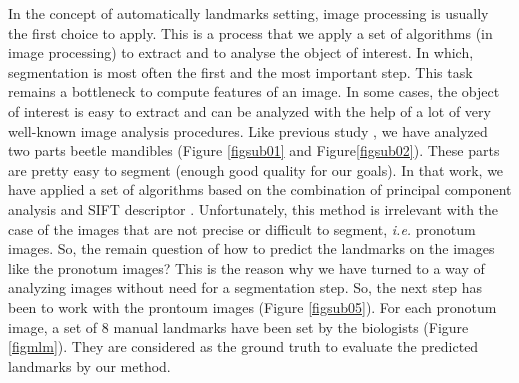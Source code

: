 \documentclass{article} %
\begin{document}
\begin{multicols}{2}
In the concept of automatically landmarks setting, image processing is usually the first choice to apply. This is a process that we apply a set of algorithms (in image processing) to extract and to analyse the object of interest. In which, segmentation is most often the first and the most important step. This task remains a bottleneck to compute features of an image. In some cases, the object of interest is easy to extract and can be analyzed with the help of a lot of very well-known image analysis procedures. Like previous study \cite{le2017maelab}, we have analyzed two parts beetle mandibles (Figure \ref{figsub01} and Figure\ref{figsub02}). These parts are pretty easy to segment (enough good quality for our goals). In that work, we have applied a set of algorithms based on the combination of principal component analysis \cite{shlens2014tutorial} and SIFT descriptor \cite{lowe2004distinctive}. 
Unfortunately, this method is irrelevant with the case of the images that are not precise or difficult to segment, \textit{i.e.} pronotum images. So, the remain question of how to predict the landmarks on the images like the pronotum images? This is the reason why we have turned to a way of analyzing images without need for a segmentation step. So, the next step has been to work with the prontoum images (Figure \ref{figsub05}). For each pronotum image, a set of 8 manual landmarks have been set by the biologists (Figure \ref{figmlm}). They are considered as the ground truth to evaluate the predicted landmarks by our method.


\end{multicols}
\end{document}
